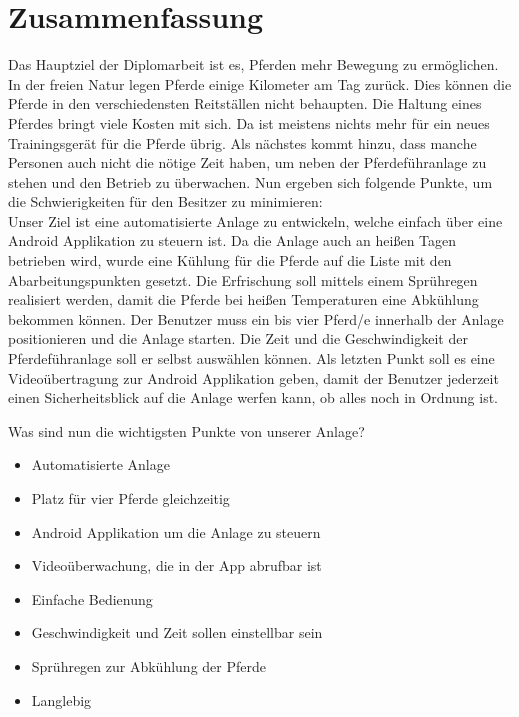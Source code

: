 \section*{Zusammenfassung}

Das Hauptziel der Diplomarbeit ist es, Pferden mehr Bewegung zu ermöglichen. In der freien Natur legen Pferde einige Kilometer am Tag zurück. Dies können die Pferde in den verschiedensten Reitställen nicht behaupten. Die Haltung eines Pferdes bringt viele Kosten mit sich. Da ist meistens nichts mehr für ein neues Trainingsgerät für die Pferde übrig. Als nächstes kommt hinzu, dass manche Personen auch nicht die nötige Zeit haben, um neben der Pferdeführanlage zu stehen und den Betrieb zu überwachen. Nun ergeben sich folgende Punkte, um die Schwierigkeiten für den Besitzer zu minimieren: \\
Unser Ziel ist eine automatisierte Anlage zu entwickeln, welche einfach über eine Android Applikation zu steuern ist. Da die Anlage auch an heißen Tagen betrieben wird, wurde eine Kühlung für die Pferde auf die Liste mit den Abarbeitungspunkten gesetzt. Die Erfrischung soll mittels einem Sprühregen realisiert werden, damit die Pferde bei heißen Temperaturen eine Abkühlung bekommen können. Der Benutzer muss ein bis vier Pferd/e innerhalb der Anlage positionieren und die Anlage starten. Die Zeit und die Geschwindigkeit der Pferdeführanlage soll er selbst auswählen können. Als letzten Punkt soll es eine Videoübertragung zur Android Applikation geben, damit der Benutzer jederzeit einen Sicherheitsblick auf die Anlage werfen kann, ob alles noch in Ordnung ist.  \newline{}

Was sind nun die wichtigsten Punkte von unserer Anlage?\\

\begin{itemize}
\item{Automatisierte Anlage}
\item{Platz für vier Pferde gleichzeitig}
\item{Android Applikation um die Anlage zu steuern}
\item{Videoüberwachung, die in der App abrufbar ist}
\item{Einfache Bedienung}
\item{Geschwindigkeit und Zeit sollen einstellbar sein} 
\item{Sprühregen zur Abkühlung der Pferde}
\item{Langlebig}
\end{itemize}


